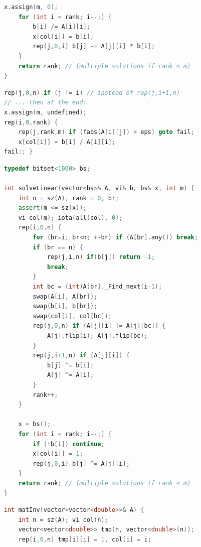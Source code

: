 \begin{multicols}{\Columns}
\begin{lstlisting}[language=C++]
	x.assign(m, 0);
	for (int i = rank; i--;) {
		b[i] /= A[i][i];
		x[col[i]] = b[i];
		rep(j,0,i) b[j] -= A[j][i] * b[i];
	}
	return rank; // (multiple solutions if rank < m)
}
\end{lstlisting}

\begin{lstlisting}[language=C++]
rep(j,0,n) if (j != i) // instead of rep(j,i+1,n)
// ... then at the end:
x.assign(m, undefined);
rep(i,0,rank) {
	rep(j,rank,m) if (fabs(A[i][j]) > eps) goto fail;
	x[col[i]] = b[i] / A[i][i];
fail:; }
\end{lstlisting}

\begin{lstlisting}[language=C++]
typedef bitset<1000> bs;

int solveLinear(vector<bs>& A, vi& b, bs& x, int m) {
	int n = sz(A), rank = 0, br;
	assert(m <= sz(x));
	vi col(m); iota(all(col), 0);
	rep(i,0,n) {
		for (br=i; br<n; ++br) if (A[br].any()) break;
		if (br == n) {
			rep(j,i,n) if(b[j]) return -1;
			break;
		}
		int bc = (int)A[br]._Find_next(i-1);
		swap(A[i], A[br]);
		swap(b[i], b[br]);
		swap(col[i], col[bc]);
		rep(j,0,n) if (A[j][i] != A[j][bc]) {
			A[j].flip(i); A[j].flip(bc);
		}
		rep(j,i+1,n) if (A[j][i]) {
			b[j] ^= b[i];
			A[j] ^= A[i];
		}
		rank++;
	}

	x = bs();
	for (int i = rank; i--;) {
		if (!b[i]) continue;
		x[col[i]] = 1;
		rep(j,0,i) b[j] ^= A[j][i];
	}
	return rank; // (multiple solutions if rank < m)
}
\end{lstlisting}

\begin{lstlisting}[language=C++]
int matInv(vector<vector<double>>& A) {
	int n = sz(A); vi col(n);
	vector<vector<double>> tmp(n, vector<double>(n));
	rep(i,0,n) tmp[i][i] = 1, col[i] = i;


\end{lstlisting}
\end{multicols}
